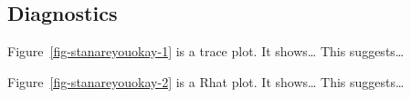 \documentclass[
  letterpaper,
  DIV=11,
  numbers=noendperiod]{scrartcl}
\begin{document}
\hypertarget{diagnostics}{%
\subsection{Diagnostics}\label{diagnostics}}

Figure~\ref{fig-stanareyouokay-1} is a trace plot. It shows\ldots{} This
suggests\ldots{}

Figure~\ref{fig-stanareyouokay-2} is a Rhat plot. It shows\ldots{} This
suggests\ldots{}

\begin{figure}

\begin{minipage}[t]{0.50\linewidth}

{\centering 


}

\end{minipage}%
%
\begin{minipage}[t]{0.50\linewidth}

{\centering 

}
\end{minipage}
\end{figure}
\end{document}
